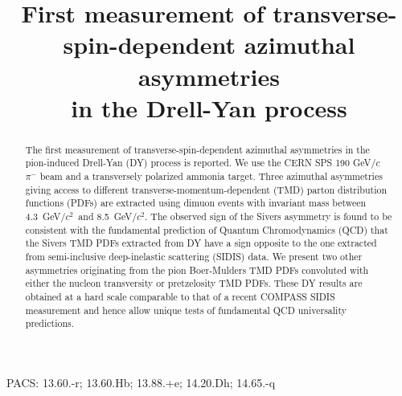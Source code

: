 \documentclass[a4paper,manyauthors,nocleardouble,COMPASS]{cernphprep}
\newcommand{\gvc}{GeV/$c$}
\newcommand{\gvcw}{GeV/$c^2$}
\begin{document}
%
\begin{titlepage}

\title{First measurement of transverse-spin-dependent azimuthal asymmetries\\ in the Drell-Yan process}


\begin{abstract}
The first measurement of transverse-spin-dependent azimuthal asymmetries in the pion-induced Drell-Yan (DY) process is reported. We use the CERN SPS 190 \gvc\, $\pi^{-}$ beam and a transversely polarized ammonia target. Three azimuthal asymmetries giving access to different transverse-momentum-dependent (TMD) parton distribution functions (PDFs) are extracted using dimuon events with invariant mass between 4.3~\gvcw\, and 8.5~\gvcw.
The observed sign of the Sivers asymmetry is found to be consistent with the fundamental prediction of Quantum Chromodynamics (QCD) that the Sivers TMD PDFs extracted from DY have a sign opposite to the one extracted from semi-inclusive deep-inelastic scattering (SIDIS) data.
We present two other asymmetries originating from the pion Boer-Mulders TMD PDFs convoluted with either the nucleon transversity or pretzelosity TMD PDFs.
These DY results are obtained at a hard scale comparable to that of a recent COMPASS SIDIS measurement and hence allow unique tests of fundamental QCD universality predictions.


\end{abstract}

\vspace*{60pt}
PACS: 13.60.-r; 13.60.Hb; 13.88.+e; 14.20.Dh; 14.65.-q

\vfill
{}

%


\end{titlepage}
\end{document}
